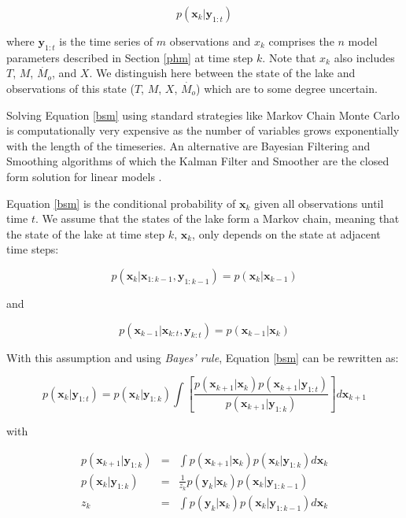 \documentclass{bmcart}
\newcommand{\bm}[1]{{\textbf{#1}}}
\begin{document}
\begin{equation}\label{bsm}
    p(\bm{x}_k|\bm{y}_{1:t})
\end{equation}

where $\bm{y}_{1:t}$ is the time series of $m$ observations and $x_k$ comprises
the $n$ model parameters described in Section \ref{phm} at time step $k$. Note
that $x_k$ also includes $T$, $M$, $\dot{M_o}$, and $X$. We distinguish here
between the state of the lake and observations of this state
($T$, $M$, $X$, $\dot{M_o}$) which are to some degree uncertain.

Solving Equation \ref{bsm} using standard strategies like Markov Chain Monte
Carlo is computationally very expensive as the number of variables grows
exponentially with the length of the timeseries. An alternative are Bayesian
Filtering and Smoothing algorithms of which the Kalman Filter and Smoother are
the closed form solution for linear models \cite{Kalman1960, Rauch1965,
sarkkaBayesianFilteringSmoothing2013}.

Equation \ref{bsm} is the conditional probability of $\bm{x}_k$ given all
observations until time $t$. We assume that the states of the lake form a
Markov chain, meaning that the state of the lake at time step $k$, $\bm{x}_k$,
only depends on the state at adjacent time steps:

\begin{equation}\label{markov1}
    p(\bm{x}_k|\bm{x}_{1:k-1}, \bm{y}_{1:k-1}) = p(\bm{x}_k|\bm{x}_{k-1})
\end{equation}

and

\begin{equation}\label{markov2}
    p(\bm{x}_{k-1}|\bm{x}_{k:t}, \bm{y}_{k:t}) = p(\bm{x}_{k-1}|\bm{x}_{k})
\end{equation}

With this assumption and using \textit{Bayes' rule}, Equation \ref{bsm} can be
rewritten \cite{sarkkaBayesianFilteringSmoothing2013} as:

\begin{equation}\label{bsm1}
p(\bm{x}_k|\bm{y}_{1:t}) = p(\bm{x}_k|\bm{y}_{1:k})
    \int\left[\frac{p(\bm{x}_{k+1}|\bm{x}_k)p(\bm{x}_{k+1}|\bm{y}_{1:t})}{p(\bm{x}_{k+1}|\bm{y}_{1:k})}\right]d\bm{x}_{k+1}
\end{equation}

with

\begin{eqnarray}\label{bfilt1}
p(\bm{x}_{k+1}|\bm{y}_{1:k}) & = & \int p(\bm{x}_{k+1}|\bm{x}_k)p(\bm{x}_k|\bm{y}_{1:k})d\bm{x}_k \\
        \label{bfilt}
    p(\bm{x}_k|\bm{y}_{1:k}) & = & \frac{1}{z_k} p(\bm{y}_k|\bm{x}_k)p(\bm{x}_k|\bm{y}_{1:k-1}) \\
        \label{zetk}
    z_k & = & \int p(\bm{y}_k|\bm{x}_k) p(\bm{x}_k| \bm{y}_{1:k-1}) d\bm{x}_k  
\end{eqnarray}
\end{document}
